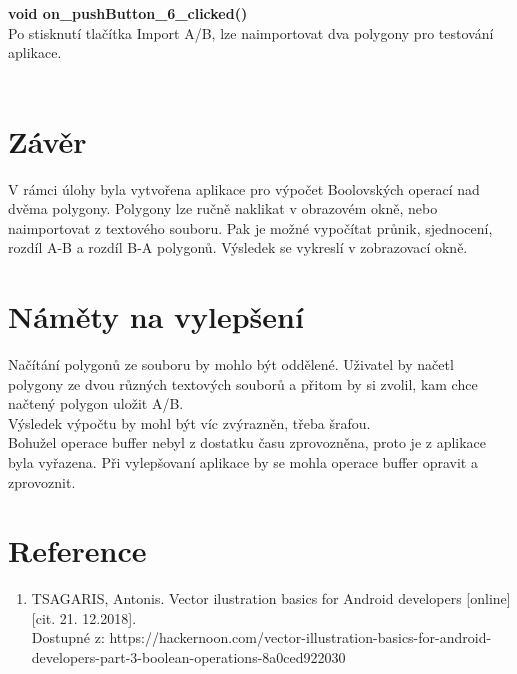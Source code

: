 \documentclass[a4paper, 12pt]{article}
\begin{document}
\textbf{void on_pushButton_6_clicked()}\\
Po stisknutí tlačítka Import A/B, lze naimportovat dva polygony pro testování aplikace.\\

\\


\clearpage
\section{Závěr}
V rámci úlohy byla vytvořena aplikace pro výpočet Boolovských operací nad dvěma polygony. Polygony lze ručně naklikat v obrazovém okně, nebo naimportovat z textového souboru. Pak je možné vypočítat průnik, sjednocení, rozdíl A-B a rozdíl B-A polygonů. Výsledek se vykreslí v zobrazovací okně.
\\

\section{Náměty na vylepšení}
Načítání polygonů ze souboru by mohlo být oddělené. Uživatel by načetl polygony ze dvou různých textových souborů a přitom by si zvolil, kam chce načtený polygon uložit A/B.\\
Výsledek výpočtu by mohl být víc zvýrazněn, třeba šrafou.\\
Bohužel operace buffer nebyl z dostatku času zprovozněna, proto je z aplikace byla vyřazena. Při vylepšovaní aplikace by se mohla operace buffer opravit a zprovoznit.\\

\clearpage
\section{Reference}

\begin{enumerate}
\item TSAGARIS, Antonis. Vector ilustration basics for Android developers [online][cit. 21. 12.2018]. \\
Dostupné z: https://hackernoon.com/vector-illustration-basics-for-android-developers-part-3-boolean-operations-8a0ced922030 \\




\end{enumerate}
\end{document}
